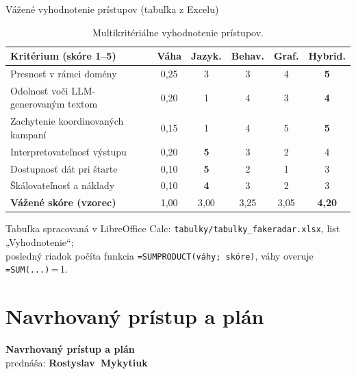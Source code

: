\documentclass[10pt]{beamer}
\newcommand{\kw}[1]{\mbox{\textbf{#1}}}
\begin{document}
\begin{frame}{Vážené vyhodnotenie prístupov (tabuľka z Excelu)}
\begin{table}
\centering
\footnotesize
\setlength{\tabcolsep}{4.5pt}
\begin{tabular}{@{}lccccc@{}}
\toprule
Kritérium (skóre 1--5) & Váha & Jazyk. & Behav. & Graf. & Hybrid. \\
\midrule
Presnosť v rámci domény           & 0{,}25 & 3 & 3 & 4 & \textbf{5} \\
Odolnosť voči LLM-generovaným textom & 0{,}20 & 1 & 4 & 3 & \textbf{4} \\
Zachytenie koordinovaných kampaní & 0{,}15 & 1 & 4 & 5 & \textbf{5} \\
Interpretovateľnosť výstupu       & 0{,}20 & \textbf{5} & 3 & 2 & 4 \\
Dostupnosť dát pri štarte         & 0{,}10 & \textbf{5} & 2 & 1 & 3 \\
Škálovateľnosť a náklady          & 0{,}10 & \textbf{4} & 3 & 2 & 3 \\
\midrule
\textbf{Vážené skóre (vzorec)}    & 1{,}00 & 3{,}00 & 3{,}25 & 3{,}05 & \textbf{4{,}20} \\
\bottomrule
\end{tabular}
\caption{Multikritériálne vyhodnotenie prístupov.}
\end{table}
\vfill
{\tiny Tabuľka spracovaná v LibreOffice Calc: \texttt{tabulky/tabulky\_fakeradar.xlsx}, list „Vyhodnotenie“;\\
posledný riadok počíta funkcia \texttt{=SUMPRODUCT(váhy; skóre)}, váhy overuje \texttt{=SUM(...)}\,=\,1.}
\end{frame}

\section{Navrhovaný prístup a plán}
\begin{frame}[plain]
  \centering
  {\LARGE\bfseries Navrhovaný prístup a plán}\\[3mm]
  {\large prednáša: \kw{Rostyslav Mykytiuk}}
\end{frame}
\end{document}
